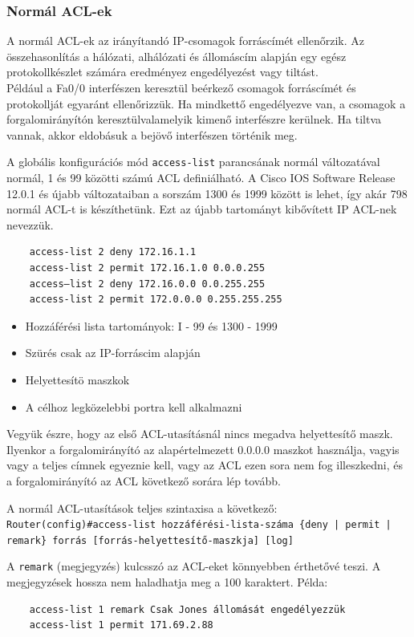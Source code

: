 \subsubsection{Normál ACL-ek}
A normál ACL-ek az irányítandó IP-csomagok forráscímét ellenőrzik. Az összehasonlítás a
hálózati, alhálózati és állomáscím alapján egy egész protokollkészlet számára eredményez
engedélyezést vagy tiltást.\\
Például a Fa0/0 interfészen keresztül beérkező csomagok forráscímét és protokollját egyaránt
ellenőrizzük. Ha mindkettő engedélyezve van, a csomagok a forgalomirányítón keresztülvalamelyik kimenő interfészre kerülnek. Ha tiltva vannak, akkor eldobásuk a bejövő
interfészen történik meg.

A globális konfigurációs mód \verb|access-list| parancsának normál változatával normál, 1 és 99
közötti számú ACL definiálható. A Cisco IOS Software Release 12.0.1 és újabb változataiban
a sorszám 1300 és 1999 között is lehet, így akár 798 normál ACL-t is készíthetünk. Ezt az
újabb tartományt kibővített IP ACL-nek nevezzük.

\begin{verbatim}
	access-list 2 deny 172.16.1.1
	access-list 2 permit 172.16.1.0 0.0.0.255
	access—list 2 deny 172.16.0.0 0.0.255.255
	access-list 2 permit 172.0.0.0 0.255.255.255
\end{verbatim}

\begin{itemize}[nosep]
	\item Hozzáférési lista tartományok: I - 99 és 1300 - 1999
	\item Szürés csak az IP-forráscim alapján
	\item Helyettesítö maszkok
	\item A célhoz legközelebbi portra kell alkalmazni
\end{itemize}

Vegyük észre, hogy az első ACL-utasításnál nincs megadva helyettesítő maszk. Ilyenkor a
forgalomirányító az alapértelmezett 0.0.0.0 maszkot használja, vagyis vagy a teljes címnek
egyeznie kell, vagy az ACL ezen sora nem fog illeszkedni, és a forgalomirányító az ACL
következő sorára lép tovább.

A normál ACL-utasítások teljes szintaxisa a következő:\\
{\small\verb+Router(config)#access-list hozzáférési-lista-száma {deny | permit | remark} forrás [forrás-helyettesítő-maszkja] [log]+}

A \verb|remark| (megjegyzés) kulcsszó az ACL-eket könnyebben érthetővé teszi. A megjegyzések
hossza nem haladhatja meg a 100 karaktert.
Példa:
\begin{verbatim}
	access-list 1 remark Csak Jones állomását engedélyezzük
	access-list 1 permit 171.69.2.88
\end{verbatim}

